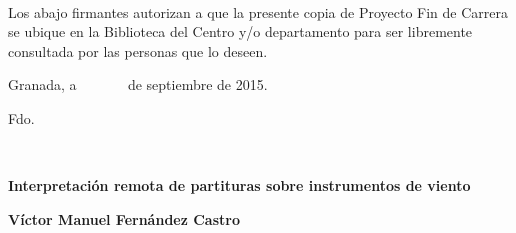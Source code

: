 \newpage
\thispagestyle{empty}

{}



\newpage
\thispagestyle{empty}
\noindent

\newpage
\thispagestyle{empty}

~

\cleardoublepage
{}
\thispagestyle{empty}


\noindent Los abajo firmantes autorizan a que la presente copia de
Proyecto Fin de Carrera se ubique en la Biblioteca del Centro y/o
departamento para ser libremente consultada por las personas que lo
deseen.

\vspace*{1cm}

\begin{center}
Granada, a ~~~~~~ de septiembre de 2015.
\par\end{center}

\bigskip%
\bigskip%
\begin{doublespace}
\hspace{4cm}Fdo.
\end{doublespace}

\newpage
\thispagestyle{empty}

~

\cleardoublepage
{}
\thispagestyle{empty}

\begin{center}
\textbf{\Large Interpretación remota de partituras sobre instrumentos de viento}
\par\end{center}{\Large \par}

\begin{center}
\textbf{\large Víctor Manuel Fernández Castro}
\par\end{center}{\large \par}

\vspace{0.75cm}







